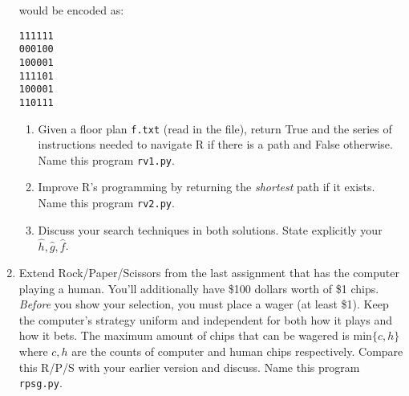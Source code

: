 \documentclass{article}
\begin{document}
\begin{enumerate}
would be encoded as:

\begin{verbatim}
111111
000100
100001
111101
100001
110111
\end{verbatim}
\begin{enumerate}
\item Given a floor plan \texttt{f.txt} (read in the file),  return \textsf{True} and the series of instructions needed to navigate \textsf{R} if there is a path and \textsf{False} otherwise.  Name this program \texttt{rv1.py}.
\item Improve \textsf{R}'s programming by returning the {\it shortest} path if it exists.  Name this program \texttt{rv2.py}.
\item Discuss your search techniques in both solutions.   State explicitly your $\hat{h}, \hat{g}, \hat{f}$.
\end{enumerate}
\item Extend Rock/Paper/Scissors from the last assignment that has the computer playing a human. You'll additionally have \$100 dollars worth of \$1 chips.  {\it Before} you show your selection, you must place a wager (at least \$1).  Keep the computer's strategy uniform and independent for both how it plays and how it bets.  The maximum amount of chips that can be wagered is $\mathrm{min}\{c,h\}$ where $c,h$ are the counts of computer and human chips respectively.  Compare this R/P/S with your earlier version and discuss.  Name this program \texttt{rpsg.py}.  

\end{enumerate}
\end{document}
